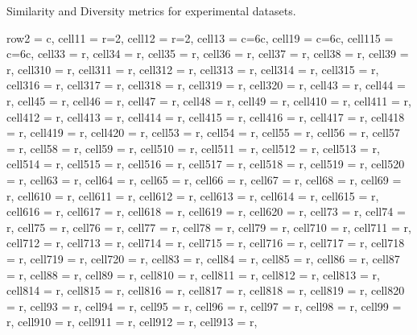 \documentclass[journal]{IEEEtran}
\begin{document}
\begin{table}
\caption{Similarity and Diversity metrics for experimental datasets.}
\centering
\begin{adjustbox}{width=\textwidth}
\begin{tblr}{
  row{2} = {c},  cell{1}{1} = {r=2}{},  cell{1}{2} = {r=2}{},  cell{1}{3} = {c=6}{c},  cell{1}{9} = {c=6}{c},  cell{1}{15} = {c=6}{c},  cell{3}{3} = {r},  cell{3}{4} = {r},  cell{3}{5} = {r},  cell{3}{6} = {r},  cell{3}{7} = {r},  cell{3}{8} = {r},  cell{3}{9} = {r},  cell{3}{10} = {r},  cell{3}{11} = {r},  cell{3}{12} = {r},  cell{3}{13} = {r},  cell{3}{14} = {r},  cell{3}{15} = {r},  cell{3}{16} = {r},  cell{3}{17} = {r},  cell{3}{18} = {r},  cell{3}{19} = {r},  cell{3}{20} = {r},  cell{4}{3} = {r},  cell{4}{4} = {r},  cell{4}{5} = {r},  cell{4}{6} = {r},  cell{4}{7} = {r},  cell{4}{8} = {r},  cell{4}{9} = {r},  cell{4}{10} = {r},  cell{4}{11} = {r},  cell{4}{12} = {r},  
  cell{4}{13} = {r},  cell{4}{14} = {r},  cell{4}{15} = {r},  cell{4}{16} = {r},  cell{4}{17} = {r},  cell{4}{18} = {r},  cell{4}{19} = {r},  cell{4}{20} = {r},  cell{5}{3} = {r},  cell{5}{4} = {r},  cell{5}{5} = {r},  cell{5}{6} = {r},  cell{5}{7} = {r},  cell{5}{8} = {r},  cell{5}{9} = {r},  cell{5}{10} = {r},  cell{5}{11} = {r},  cell{5}{12} = {r},  cell{5}{13} = {r},  cell{5}{14} = {r},  cell{5}{15} = {r},  cell{5}{16} = {r},  cell{5}{17} = {r},  cell{5}{18} = {r},  cell{5}{19} = {r},  cell{5}{20} = {r},  cell{6}{3} = {r},  cell{6}{4} = {r},  
  cell{6}{5} = {r},  cell{6}{6} = {r},  cell{6}{7} = {r},  cell{6}{8} = {r},  cell{6}{9} = {r},  cell{6}{10} = {r},  cell{6}{11} = {r},  cell{6}{12} = {r},  cell{6}{13} = {r},  cell{6}{14} = {r},  cell{6}{15} = {r},  cell{6}{16} = {r},  cell{6}{17} = {r},  cell{6}{18} = {r},  cell{6}{19} = {r},  cell{6}{20} = {r},  cell{7}{3} = {r},  cell{7}{4} = {r},  cell{7}{5} = {r},  cell{7}{6} = {r},  cell{7}{7} = {r},  cell{7}{8} = {r},  cell{7}{9} = {r},  cell{7}{10} = {r},  cell{7}{11} = {r},  cell{7}{12} = {r},  cell{7}{13} = {r},  cell{7}{14} = {r},  cell{7}{15} = {r},  cell{7}{16} = {r},  cell{7}{17} = {r},  cell{7}{18} = {r},  cell{7}{19} = {r},  cell{7}{20} = {r},  cell{8}{3} = {r},  
  cell{8}{4} = {r},  cell{8}{5} = {r},  cell{8}{6} = {r},  cell{8}{7} = {r},  cell{8}{8} = {r},  cell{8}{9} = {r},  cell{8}{10} = {r},  cell{8}{11} = {r},  cell{8}{12} = {r},  cell{8}{13} = {r},  cell{8}{14} = {r},  cell{8}{15} = {r},  cell{8}{16} = {r},  cell{8}{17} = {r},  cell{8}{18} = {r},  cell{8}{19} = {r},  cell{8}{20} = {r},  cell{9}{3} = {r},  cell{9}{4} = {r},  cell{9}{5} = {r},  cell{9}{6} = {r},  cell{9}{7} = {r},  cell{9}{8} = {r},  cell{9}{9} = {r},  cell{9}{10} = {r},  cell{9}{11} = {r},  cell{9}{12} = {r},  cell{9}{13} = {r},  
}
\end{tblr}
\end{adjustbox}
\end{table}
\end{document}
